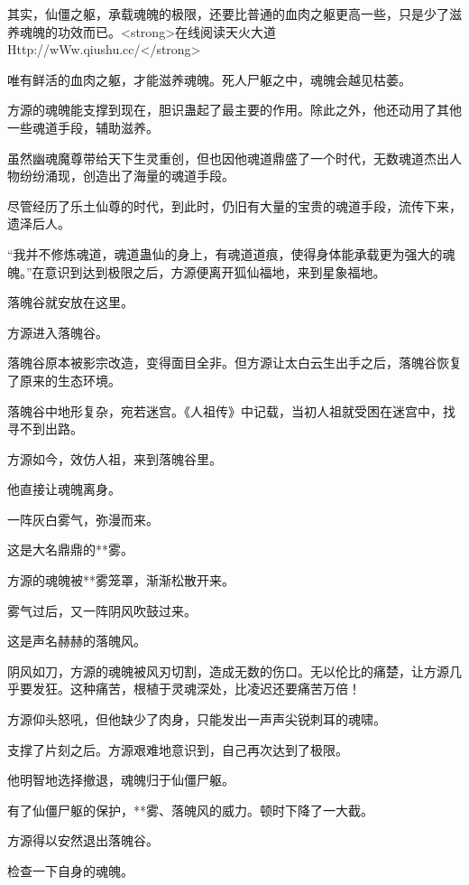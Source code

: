 
\begin{this_body}

其实，仙僵之躯，承载魂魄的极限，还要比普通的血肉之躯更高一些，只是少了滋养魂魄的功效而已。<strong>在线阅读天火大道Http://wWw.qiushu.cc/</strong>

唯有鲜活的血肉之躯，才能滋养魂魄。死人尸躯之中，魂魄会越见枯萎。

方源的魂魄能支撑到现在，胆识蛊起了最主要的作用。除此之外，他还动用了其他一些魂道手段，辅助滋养。

虽然幽魂魔尊带给天下生灵重创，但也因他魂道鼎盛了一个时代，无数魂道杰出人物纷纷涌现，创造出了海量的魂道手段。

尽管经历了乐土仙尊的时代，到此时，仍旧有大量的宝贵的魂道手段，流传下来，遗泽后人。

“我并不修炼魂道，魂道蛊仙的身上，有魂道道痕，使得身体能承载更为强大的魂魄。”在意识到达到极限之后，方源便离开狐仙福地，来到星象福地。

落魄谷就安放在这里。

方源进入落魄谷。

落魄谷原本被影宗改造，变得面目全非。但方源让太白云生出手之后，落魄谷恢复了原来的生态环境。

落魄谷中地形复杂，宛若迷宫。《人祖传》中记载，当初人祖就受困在迷宫中，找寻不到出路。

方源如今，效仿人祖，来到落魄谷里。

他直接让魂魄离身。

一阵灰白雾气，弥漫而来。

这是大名鼎鼎的**雾。

方源的魂魄被**雾笼罩，渐渐松散开来。

雾气过后，又一阵阴风吹鼓过来。

这是声名赫赫的落魄风。

阴风如刀，方源的魂魄被风刃切割，造成无数的伤口。无以伦比的痛楚，让方源几乎要发狂。这种痛苦，根植于灵魂深处，比凌迟还要痛苦万倍！

方源仰头怒吼，但他缺少了肉身，只能发出一声声尖锐刺耳的魂啸。

支撑了片刻之后。方源艰难地意识到，自己再次达到了极限。

他明智地选择撤退，魂魄归于仙僵尸躯。

有了仙僵尸躯的保护，**雾、落魄风的威力。顿时下降了一大截。

方源得以安然退出落魄谷。

检查一下自身的魂魄。


\end{this_body}
